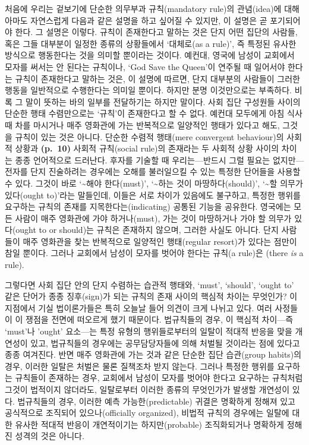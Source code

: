 처음에 우리는 겉보기에 단순한 의무부과 규칙(mandatory rule)의
관념(idea)에 대해 아마도 자연스럽게 다음과 같은 설명을 하고 싶어질 수
있지만, 이 설명은 곧 포기되어야 한다. 그 설명은 이렇다. 규칙이
존재한다고 말하는 것은 단지 어떤 집단의 사람들, 혹은 그들 대부분이
일정한 종류의 상황들에서 ‘대체로(as a rule)’, 즉
 특정된 유사한 방식으로 행동한다는 것을
의미할 뿐이라는 것이다. 예컨대, 영국에 남성이 교회에서 모자를 써서는 안
된다는 규칙이나, `God Save the Queen'이 연주될 때 일어서야 한다는 규칙이
존재한다고 말하는 것은, 이 설명에 따르면, 단지 대부분의 사람들이 그러한
행동을 일반적으로 수행한다는 의미일 뿐이다. 하지만 분명 이것만으로는
부족하다. 비록 그 말이 뜻하는 바의 일부를 전달하기는 하지만 말이다. 사회
집단 구성원들 사이의 단순한 행태 수렴만으로는 ‘규칙’이 존재한다고 할 수
없다. 예컨대 모두에게 아침 식사 때 차를 마시거나 매주 영화관에 가는
반복적으로 일양적인 행태가 있다고 해도, 그것을
 규칙이 있는 것은 아니다. 단순한 수렴적
행태(mere convergent behaviour)의 사회적 상황과 \textbf{(p.~10)} 사회적
규칙(social rule)의 존재라는 두 사회적 상황 사이의 차이는 종종
언어적으로 드러난다. 후자를 기술할 때 우리는---반드시 그럴 필요는
없지만---전자를 단지 진술하려는 경우에는 오해를 불러일으킬 수 있는
특정한 단어들을 사용할 수 있다. 그것이 바로 ‘\textasciitilde 해야
한다(must)’, ‘\textasciitilde 하는 것이 마땅하다(should)’,
‘\textasciitilde 할 의무가 있다(ought to)’라는 말들인데, 이들은 서로
차이가 있음에도 불구하고, 특정한 행위를 요구하는 규칙의 존재를
지목한다는(indicating) 공통된 기능을 공유한다. 영국에는 모든 사람이 매주
영화관에 가야 하거나(must), 가는 것이 마땅하거나 가야 할 의무가
있다(ought to or should)는 규칙은 존재하지 않으며, 그러한 사실도 아니다.
단지 사람들이 매주 영화관을 찾는 반복적으로 일양적인 행태(regular
resort)가 있다는 점만이 참일 뿐이다. 그러나 교회에서 남성이 모자를
벗어야 한다는 규칙(a rule)은 (there \emph{is} a rule).

그렇다면 사회 집단 안의 단지 수렴하는 습관적 행태와, `must', `should',
`ought to' 같은 단어가 종종 징후(sign)가 되는 규칙의 존재 사이의 핵심적
차이는 무엇인가? 이 지점에서 기실 법이론가들은 특히 오늘날 들어 의견이
크게 나뉘고 있다. 여러 사정들이 이 쟁점을 전면에 떠오르게 했기 때문이다.
법규칙들의 경우, 이 핵심적 차이---즉 `must'나 'ought' 요소---는 특정
유형의 행위들로부터의 일탈이 적대적 반응을 맞을 개연성이 있고,
법규칙들의 경우에는 공무담당자들에 의해 처벌될 것이라는 점에 있다고 종종
여겨진다. 반면 매주 영화관에 가는 것과 같은 단순한 집단 습관(group
habits)의 경우, 이러한 일탈은 처벌은 물론 질책조차 받지 않는다. 그러나
특정한 행위를 요구하는 규칙들이 존재하는 경우, 교회에서 남성이 모자를
벗어야 한다고 요구하는 규칙처럼 그것이 법적이지 않더라도, 일탈로부터
이러한 종류의 무엇인가가 발생할 개연성이 있다. 법규칙들의 경우, 이러한
예측 가능한(predictable) 귀결은 명확하게 정해져 있고 공식적으로 조직되어
있으나(officially organized), 비법적 규칙의 경우에는 일탈에 대한 유사한
적대적 반응이 개연적이기는 하지만(probable) 조직화되거나 명확하게 정해진
성격의 것은 아니다.

